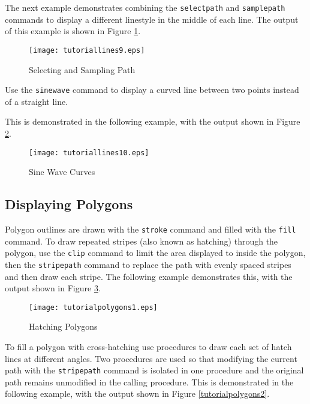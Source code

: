 The next example demonstrates combining the \texttt{selectpath}
and \texttt{samplepath} commands to display a different linestyle
in the middle of each line.
The output of this example is shown in Figure \ref{tutoriallines9}.



\begin{figure}[htb]
\texttt{[image: tutoriallines9.eps]}
\caption{Selecting and Sampling Path}
\label{tutoriallines9}
\end{figure}

Use the \texttt{sinewave} command to display a curved line between
two points instead of a straight line.

This is demonstrated in the following example,
with the output shown in Figure \ref{tutoriallines10}.



\begin{figure}[htb]
\texttt{[image: tutoriallines10.eps]}
\caption{Sine Wave Curves}
\label{tutoriallines10}
\end{figure}

\subsection{Displaying Polygons}

Polygon outlines are drawn with the \texttt{stroke}
command and filled with the \texttt{fill} command.
To draw repeated stripes (also known as hatching) through
the polygon, use the \texttt{clip}
command to limit the area displayed to inside the polygon,
then the \texttt{stripepath}
command to replace the path with evenly spaced stripes and
then draw each stripe.  The following example demonstrates this,
with the output shown in Figure \ref{tutorialpolygons1}.



\begin{figure}[htb]
\texttt{[image: tutorialpolygons1.eps]}
\caption{Hatching Polygons}
\label{tutorialpolygons1}
\end{figure}

To fill a polygon with cross-hatching use procedures to
draw each set of hatch lines at different angles.  Two procedures
are used so that modifying the current path with the
\texttt{stripepath}
command is isolated in one procedure and the original path
remains unmodified in the calling procedure.
This is demonstrated in the following example, with the output
shown in Figure \ref{tutorialpolygons2}.

